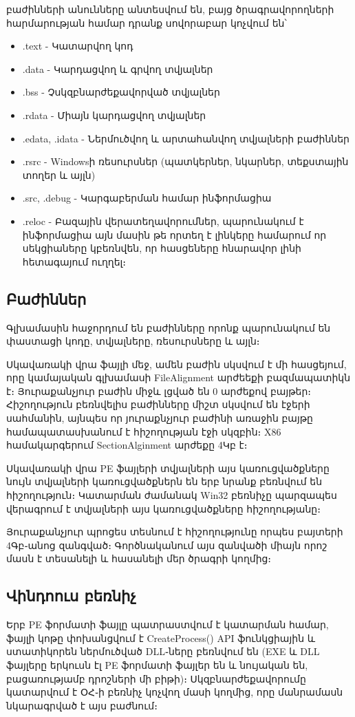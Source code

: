 \documentclass[12pt]{article}
\begin{document}
\begin{sloppypar}
բաժինների անունները անտեսվում են, բայց ծրագրավորողների հարմարության համար
դրանք սովորաբար կոչվում են՝

\begin{itemize}
\item .text - Կատարվող կոդ
\item .data - Կարդացվող և գրվող տվյալներ
\item .bss - Չսկզբնարժեքավորված տվյալներ
\item .rdata - Միայն կարդացվող տվյալներ
\item .edata, .idata - Ներմուծվող և արտահանվող տվյալների բաժիններ
\item .rsrc - Windowsի ռեսուրսներ (պատկերներ, նկարներ, տեքստային տողեր և այլն)
\item .src, .debug - Կարգաբերման համար ինֆորմացիա
\item .reloc - Բազային վերատեղավորումներ, պարունակում է ինֆորմացիա այն մասին
	թե որտեղ է լինկերը համարում որ սեկցիաները կբեռնվեն, որ հասցեները հնարավոր
	լինի հետագայում ուղղել։
\end{itemize}

\subsection{Բաժիններ}
Գլխամասին հաջորդում են բաժինները որոնք պարունակում են փաստացի կոդը,
տվյալները, ռեսուրսները և այլն։

Սկավառակի վրա ֆայլի մեջ, ամեն բաժին սկսվում է մի հասցեյում, որը կամայական
գլխամասի FileAlignment արժեեքի բազմապատիկն է։ Յուրաքանչյուր բաժին միջև լցված
են 0 արժեքով բայթեր։ Հիշողություն բեռնվելիս բաժինները միշտ սկսվում են
էջերի սահմանին, այնպես որ յուրաքնչյուր բաժինի առաջին բայթը համապատասխանում է
հիշողության էջի սկզբին։ X86 համակարգերում SectionAlginment արժեքը 4Կբ է։

Սկավառակի վրա PE ֆայլերի տվյալների այս կառուցվածքները նույն տվյալների
կառուցվածքներն են երբ նրանք բեռնվում են հիշողություն։ Կատարման ժամանակ
Win32 բեռնիչը պարզապես վերագրում է տվյալների այս կառուցվածքները հիշողությանը։

Յուրաքանչյուր պրոցես տեսնում է հիշողությունը որպես բայտերի 4Գբ֊անոց զանգված։
Գործնականում այս զանվածի միայն որոշ մասն է տեսանելի և հասանելի մեր ծրագրի
կողմից։

\subsection{Վինդոուս բեռնիչ}
Երբ PE ֆորմատի ֆայլը պատրաստվում է կատարման համար, ֆայլի կոթը փոխանցվում է
CreateProcess() API ֆունկցիային և ստատիկորեն ներմուծված DLL֊ները բեռնվում են
(EXE և DLL ֆայլերը երկուսն էլ PE ֆորմատի ֆայլեր են և նույական են, բացառությամբ
դրոշների մի բիթի)։ Սկզբնարժեքավորումը կատարվում է ՕՀ֊ի բեռնիչ կոչվող մասի
կողմից, որը մանրամասն նկարագրված է այս բաժնում։


\end{sloppypar}
\end{document}
